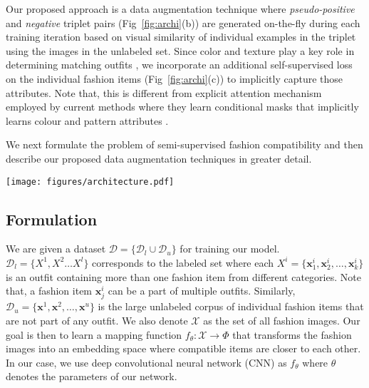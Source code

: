 \documentclass[sigconf]{acmart}
\begin{document}
Our proposed approach is a data augmentation technique where {\em pseudo-positive} and {\em negative} triplet pairs (Fig~\ref{fig:archi}(b)) are generated on-the-fly during each training iteration based on visual similarity of individual examples in the triplet using the images in the unlabeled set. Since color and texture play a key role in determining matching outfits \cite{kim2020self}, we incorporate an additional self-supervised loss on the individual fashion items (Fig~\ref{fig:archi}(c)) to implicitly capture those attributes. Note that, this is different from explicit attention mechanism employed by current methods where they learn conditional masks that implicitly learns colour and pattern attributes \cite{iccv2019learning,cvpr2020fashion}.

 We next formulate the problem of semi-supervised fashion compatibility and then describe our proposed data augmentation techniques in greater detail. 
 
\begin{figure*}
    \centering
    \texttt{[image: figures/architecture.pdf]}
    \caption{{\bf Overview of our proposed approach}. \textbf{A}. Triplet loss $\mathcal{L}_{l}$ on labeled items: Anchor item $A$, Compatible positive item $P$ and Non-compatible negative item $N$. \textbf{B} Triplet loss $\mathcal{L}_{pseudo}$ on pseudo-labelled items in the unlabeled item batch $\mathbf{b}_U$. The figure shows visually rich low-dimensional embedding space $\Phi$ where we compose nearest pseudo triplets for training. See Sec. \ref{sec:l_pseudo}. \textbf{C}. Triplet losses $\mathcal{L}_{ss}$ on {\em shape} and {\em appearance} transformed images. See Sec. \ref{sec:l_ss}}
    \label{fig:archi}
\end{figure*}

\subsection{Formulation}
We are given a dataset $\mathcal{D} = \{\mathcal{D}_{l} \cup \mathcal{D}_{u}\}$ for training our model. $\mathcal{D}_{l}=\{X^1,X^2\dots X^l\}$ corresponds to the labeled set where each  $X^i=\{\mathbf{x}^i_1, \mathbf{x}^i_2,\dots, \mathbf{x}^i_k\}$ is an outfit containing more than one fashion item from different categories. Note that, a fashion item $\mathbf{x}^i_j$ can be a part of multiple outfits. Similarly, $\mathcal{D}_{u}=\{\mathbf{x}^1,\mathbf{x}^2,\dots,\mathbf{x}^u\}$ is the large unlabeled corpus of individual fashion items that are not part of any outfit.
We also denote $\mathcal{X}$ as the set of all fashion images. Our goal is then to learn a mapping function $f_{\theta}:\mathcal{X}\rightarrow\Phi$ that transforms the fashion images into an embedding space where compatible items are closer to each other. In our case, we use deep convolutional neural network (\textsc{CNN}) as $f_{\theta}$ where $\theta$ denotes the parameters of our network.
\end{document}
